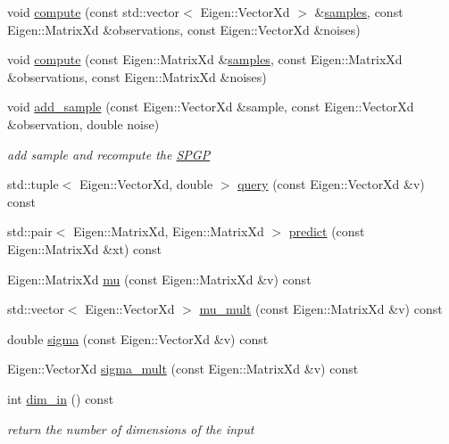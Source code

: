 \begin{DoxyCompactItemize}
void \hyperlink{classlimbo_1_1model_1_1_s_p_g_p_af6f266cb123980286d8c2a445cf61825}{compute} (const std\+::vector$<$ Eigen\+::\+Vector\+Xd $>$ \&\hyperlink{classlimbo_1_1model_1_1_s_p_g_p_a867505eb41e8fe971eb7de28b2cea50f}{samples}, const Eigen\+::\+Matrix\+Xd \&observations, const Eigen\+::\+Vector\+Xd \&noises)
\item 
void \hyperlink{classlimbo_1_1model_1_1_s_p_g_p_a2729a11aedaa9373908e009387e7ca96}{compute} (const Eigen\+::\+Matrix\+Xd \&\hyperlink{classlimbo_1_1model_1_1_s_p_g_p_a867505eb41e8fe971eb7de28b2cea50f}{samples}, const Eigen\+::\+Matrix\+Xd \&observations, const Eigen\+::\+Matrix\+Xd \&noises)
\item 
void \hyperlink{classlimbo_1_1model_1_1_s_p_g_p_a2d12288884fadcd922c56718f70801a9}{add\+\_\+sample} (const Eigen\+::\+Vector\+Xd \&sample, const Eigen\+::\+Vector\+Xd \&observation, double noise)
\begin{DoxyCompactList}\small\item\em add sample and recompute the \hyperlink{classlimbo_1_1model_1_1_s_p_g_p}{S\+P\+GP} \end{DoxyCompactList}\item 
std\+::tuple$<$ Eigen\+::\+Vector\+Xd, double $>$ \hyperlink{classlimbo_1_1model_1_1_s_p_g_p_a42182a521e79e95b7e9cc4f1cd256650}{query} (const Eigen\+::\+Vector\+Xd \&v) const 
\item 
std\+::pair$<$ Eigen\+::\+Matrix\+Xd, Eigen\+::\+Matrix\+Xd $>$ \hyperlink{classlimbo_1_1model_1_1_s_p_g_p_ad699ef0c60c08ad24513d16d6c4f0c26}{predict} (const Eigen\+::\+Matrix\+Xd \&xt) const 
\item 
Eigen\+::\+Matrix\+Xd \hyperlink{classlimbo_1_1model_1_1_s_p_g_p_a93dc0f879b84a302382edf103fa00da9}{mu} (const Eigen\+::\+Matrix\+Xd \&v) const 
\item 
std\+::vector$<$ Eigen\+::\+Vector\+Xd $>$ \hyperlink{classlimbo_1_1model_1_1_s_p_g_p_ab7cd17b138cae0693ebec8101b401ee0}{mu\+\_\+mult} (const Eigen\+::\+Matrix\+Xd \&v) const 
\item 
double \hyperlink{classlimbo_1_1model_1_1_s_p_g_p_a69e98f453f5bcb2cf2c76469f91fab24}{sigma} (const Eigen\+::\+Vector\+Xd \&v) const 
\item 
Eigen\+::\+Vector\+Xd \hyperlink{classlimbo_1_1model_1_1_s_p_g_p_aed832adbf5fcfa305aac4699d809677e}{sigma\+\_\+mult} (const Eigen\+::\+Matrix\+Xd \&v) const 
\item 
int \hyperlink{classlimbo_1_1model_1_1_s_p_g_p_ab84d7663a814757766c2d630e0bacd9e}{dim\+\_\+in} () const 
\begin{DoxyCompactList}\small\item\em return the number of dimensions of the input \end{DoxyCompactList}\item 

\end{DoxyCompactItemize}
